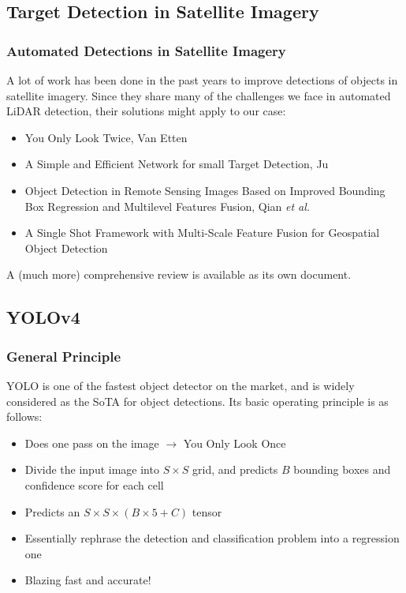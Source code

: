 \documentclass[aspectratio=169]{beamer}
\begin{document}
	\subsection{Target Detection in Satellite Imagery}
	\begin{frame}
		\frametitle{Automated Detections in Satellite Imagery}
		A lot of work has been done in the past years to improve detections of objects in satellite imagery. Since they share many of the challenges we face in automated LiDAR detection, their solutions might apply to our case:
		\begin{itemize}
			\item You Only Look Twice, Van Etten\cite{yolt}
			\item A Simple and Efficient Network for small Target Detection, Ju \cite{sen}
			\item Object Detection in Remote Sensing Images Based on Improved Bounding Box Regression and Multilevel Features Fusion, Qian \textit{et al.} \cite{qianAl}
			\item A Single Shot Framework with Multi-Scale Feature Fusion for Geospatial Object Detection\cite{zhuang2019}
		\end{itemize}
		A (much more) comprehensive review is available as its own document. 
	\end{frame}

	\subsection{YOLOv4}
	\begin{frame}
		\frametitle{General Principle} 
		YOLO\cite{yolov1} is one of the fastest object detector on the market, and is widely considered as the SoTA for object detections. Its basic operating principle is as follows:
		\begin{itemize}
			\item Does one pass on the image $\rightarrow$ You Only Look Once
			\item Divide the input image into $S \times S$ grid, and predicts $B$ bounding boxes and confidence score for each cell
			\item Predicts an $S \times S \times (B \times 5 + C)$ tensor  
			\item Essentially rephrase the detection and classification problem into a regression one
			\item Blazing fast and accurate!
		\end{itemize}
	\end{frame}
\end{document}
